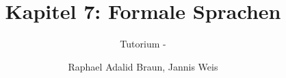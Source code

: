 \documentclass[18pt]{beamer}
\title[Formale Sprachen]{Kapitel 7: Formale Sprachen}
\subtitle{Tutorium - } %
\author{Raphael Adalid Braun, Jannis Weis}
\institute{Grundbegriffe der Informatik | WS 2018/19}
\begin{document}

\begin{frame}
 \titlepage
\end{frame}

\def\showSolutions{1}					 %

\title[Formale Sprachen]{}

\end{document}
